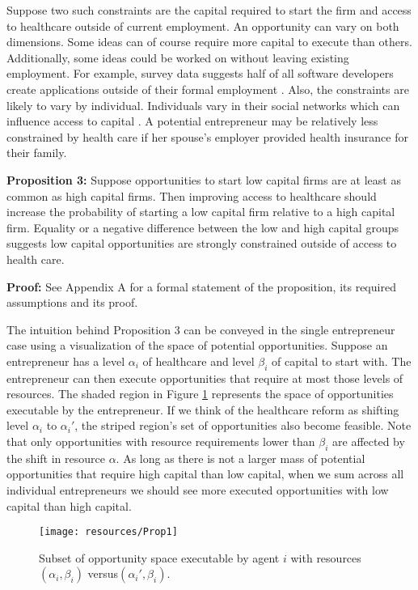 \documentclass[12pt]{article}
\begin{document}
Suppose two such constraints are the capital required to start the firm and access to healthcare  outside of current employment. An opportunity can vary on both dimensions. Some ideas can of course require more capital to execute than others. Additionally, some ideas could be worked on without leaving existing employment. For example, survey data suggests half of all software developers create applications outside of their formal employment \cite{evans}. Also, the constraints are likely to vary by individual. Individuals vary in their social networks which can influence access to capital \cite{uzzi}. A potential entrepreneur may be relatively less constrained by health care if her spouse's employer provided health insurance for their family. 

\textbf{Proposition 3:} 
Suppose opportunities to start low capital firms are at least as common as high capital firms. Then improving access to healthcare should increase the probability of starting a low capital firm relative to a high capital firm. Equality or a negative difference between the low and high capital groups suggests low capital opportunities are strongly constrained outside of access to health care. 

\textbf{Proof:}
See Appendix A for a formal statement of the proposition, its required assumptions and its proof. 

The intuition behind Proposition 3 can be conveyed in the single entrepreneur case using a visualization of the space of potential opportunities. Suppose an entrepreneur has a level $\alpha_i$ of healthcare and level $\beta_i$ of capital to start with. The entrepreneur can then execute opportunities that require at most those levels of resources. The shaded region in Figure \ref{fig:ideaSpace} represents the space of opportunities executable by the entrepreneur. If we think of the healthcare reform as shifting level $\alpha_i$ to $\alpha_i'$, the striped region's set of opportunities also become feasible. Note that only opportunities with resource requirements lower than $\beta_i$ are affected by the shift in resource $\alpha$. As long as there is not a larger mass of potential opportunities that require high capital than low capital, when we sum across all individual entrepreneurs we should see more executed opportunities with low capital than high capital. 

\begin{figure}[H]
	\centering
	\texttt{[image: resources/Prop1]}
	\caption{Subset of opportunity space executable by agent $i$ with resources $(\alpha_i,\beta_i)$ versus$(\alpha_i', \beta_i)$.}
	\label{fig:ideaSpace}
\end{figure}
\end{document}
